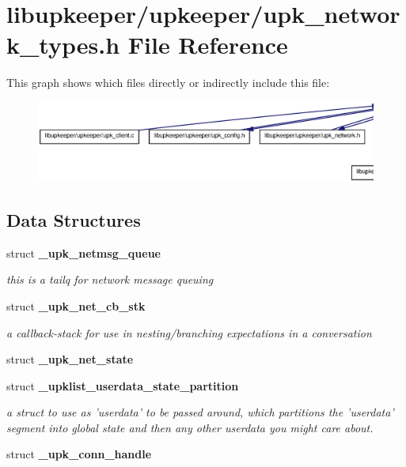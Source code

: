 \section{libupkeeper/upkeeper/upk\_\-network\_\-types.h File Reference}
\label{upk__network__types_8h}
This graph shows which files directly or indirectly include this file:
\nopagebreak
\begin{figure}[H]
\begin{center}
\leavevmode
\includegraphics[width=400pt]{upk__network__types_8h__dep__incl}
\end{center}
\end{figure}
\subsection*{Data Structures}
\begin{DoxyCompactItemize}
\item 
struct {\bf \_\-upk\_\-netmsg\_\-queue}
\begin{DoxyCompactList}\small\item\em this is a tailq for network message queuing \end{DoxyCompactList}\item 
struct {\bf \_\-upk\_\-net\_\-cb\_\-stk}
\begin{DoxyCompactList}\small\item\em a callback-\/stack for use in nesting/branching expectations in a conversation \end{DoxyCompactList}\item 
struct {\bf \_\-upk\_\-net\_\-state}
\item 
struct {\bf \_\-upklist\_\-userdata\_\-state\_\-partition}
\begin{DoxyCompactList}\small\item\em a struct to use as 'userdata' to be passed around, which partitions the 'userdata' segment into global state and then any other userdata you might care about. \end{DoxyCompactList}\item 
struct {\bf \_\-upk\_\-conn\_\-handle}
\end{DoxyCompactItemize}
